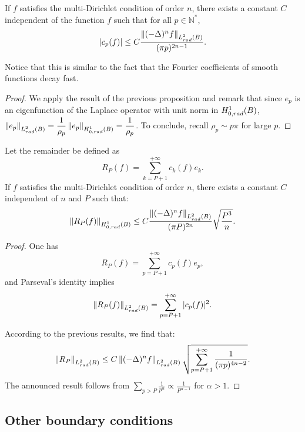 \documentclass[11pt,a4paper]{article}
\begin{document}
\begin{Cor} If $f$ satisfies the multi-Dirichlet condition of order $n$, there exists a constant $C$ independent of the function $f$ such that for all $p \in \mathbb{N^*}$, 
	\[ |c_p(f)| \leq  C \dfrac{\left\|(-\Delta)^n f\right\|_{L^2_{rad}(B)}}{(\pi p)^{2n-1}}.\] 
\end{Cor}
\noindent Notice that this is similar to the fact that the Fourier coefficients of smooth functions decay fast. 
\begin{proof}
	We apply the result of the previous proposition and remark that since $e_p$ is an eigenfunction of the Laplace operator with unit norm in $H^1_{0,rad}(B)$, $\left\|e_p\right\|_{L^2_{rad}(B)} = \dfrac{1}{\rho_p}\left\|e_p\right\|_{H^1_{0,rad}(B)} = \dfrac{1}{\rho_p}$. To conclude, recall $\rho_{p} \sim p\pi$ for large $p$.\qedhere
\end{proof}

\begin{Cor} Let the remainder be defined as 
	\[R_P(f) = \displaystyle\sum_{k = P+1}^{+\infty} c_{k}(f) e_{k}.\]
	If $f$ satisfies the multi-Dirichlet condition of order $n$, there exists a constant $C$ independent of $n$ and $P$ such that: 
	\[\left\|R_P(f)\right\|_{H^1_{0,rad}(B)} \leq C\dfrac{\left\|(-\Delta)^n f\right\|_{L^2_{rad}(B)}}{(\pi P)^{2n}}\sqrt{\dfrac{P^3}{n}}.\]
	\label{EstimationRest}
																																																								
	\begin{proof}
		One has 
		\[R_P(f) = \sum_{p=P+1}^{+\infty}c_p(f) e_p,\]
		and Parseval's identity implies
		\[\left\|R_P(f)\right\|_{L^2_{rad}(B)} = \sum_{p=P+1}^{+\infty}|c_p(f)|^2.\]
																																				
		According to the previous results, we find that:
		\[\left\|R_P\right\|_{L^2_{rad}(B)} \leq C \left\|(-\Delta)^n f\right\|_{L^2_{rad}(B)}\sqrt{\sum_{p= P+1}^{+\infty} \dfrac{1}{(\pi p)^{4n-2}}}.\]
		The announced result follows from $\displaystyle\sum_{p > P} \frac{1}{p^{\alpha}} \propto \frac{1}{P^{\alpha-1}}$ for $\alpha > 1$. \qedhere
	\end{proof}
\end{Cor}

\subsection{Other boundary conditions}
\end{document}
